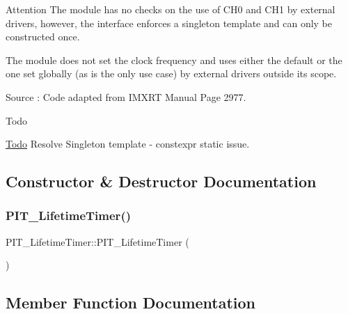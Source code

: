 \begin{DoxyAttention}{Attention}
The module has no checks on the use of C\+H0 and C\+H1 by external drivers, however, the interface enforces a singleton template and can only be constructed once. 

The module does not set the clock frequency and uses either the default or the one set globally (as is the only use case) by external drivers outside its scope. 

Source \+: Code adapted from I\+M\+X\+RT Manual Page 2977. 
\end{DoxyAttention}
\begin{DoxyRefDesc}{Todo}
\item[\hyperlink{todo__todo000002}{Todo}]Resolve Singleton template -\/ constexpr static issue. \end{DoxyRefDesc}


\subsection{Constructor \& Destructor Documentation}
\mbox{\label{classPIT__LifetimeTimer_a826797e75688ab4e7cd5c8854fa6a7c0}} 
\subsubsection{\texorpdfstring{P\+I\+T\+\_\+\+Lifetime\+Timer()}{PIT\_LifetimeTimer()}}
{\footnotesize\ttfamily P\+I\+T\+\_\+\+Lifetime\+Timer\+::\+P\+I\+T\+\_\+\+Lifetime\+Timer (\begin{DoxyParamCaption}{ }\end{DoxyParamCaption})\hspace{0.3cm}{\ttfamily [inline]}}



\subsection{Member Function Documentation}
\mbox{\label{classPIT__LifetimeTimer_af7481214070333f845a23456b4d75880}} 
